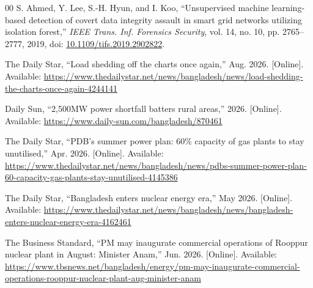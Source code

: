 \documentclass[conference,a4paper]{IEEEtran}
\begin{document}
\begin{thebibliography}{00}
 S. Ahmed, Y. Lee, S.-H. Hyun, and
I. Koo, ``Unsupervised machine learning-based detection of covert data
integrity assault in smart grid networks utilizing isolation forest,''
\emph{IEEE Trans. Inf. Forensics Security}, vol. 14, no. 10, pp.
2765--2777, 2019, doi:
\href{https://doi.org/10.1109/tifs.2019.2902822}{10.1109/tifs.2019.2902822}.

 The Daily Star, ``Load shedding
off the charts once again,'' Aug. 2026. [Online]. Available:
\url{https://www.thedailystar.net/news/bangladesh/news/load-shedding-the-charts-once-again-4244141}

 Daily Sun, ``2{,}500MW power shortfall
batters rural areas,'' 2026. [Online]. Available:
\url{https://www.daily-sun.com/bangladesh/870461}

 The Daily Star, ``PDB's summer power
plan: 60\% capacity of gas plants to stay unutilised,'' Apr. 2026.
[Online]. Available:
\url{https://www.thedailystar.net/news/bangladesh/news/pdbs-summer-power-plan-60-capacity-gas-plants-stay-unutilised-4145386}

 The Daily Star, ``Bangladesh enters
nuclear energy era,'' May 2026. [Online]. Available:
\url{https://www.thedailystar.net/news/bangladesh/news/bangladesh-enters-nuclear-energy-era-4162461}

 The Business Standard, ``PM may inaugurate
commercial operations of Rooppur nuclear plant in August: Minister
Anam,'' Jun. 2026. [Online]. Available:
\url{https://www.tbsnews.net/bangladesh/energy/pm-may-inaugurate-commercial-operations-rooppur-nuclear-plant-aug-minister-anam}

\end{thebibliography}
\end{document}
